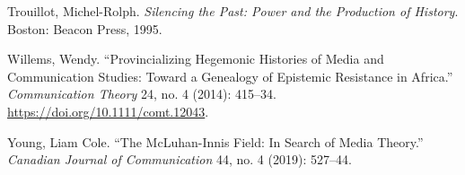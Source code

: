 \documentclass{tufte-handout}
\begin{document}
\begin{hangparas}{.25in}{1}
Trouillot, Michel-Rolph. \emph{Silencing the Past: Power and the
Production of History}. Boston: Beacon Press, 1995.

Willems, Wendy. ``Provincializing Hegemonic Histories of Media and
Communication Studies: Toward a Genealogy of Epistemic Resistance in
Africa.'' \emph{Communication Theory} 24, no. 4 (2014): 415--34.
\url{https://doi.org/10.1111/comt.12043}.

Young, Liam Cole. ``The McLuhan-Innis Field: In Search of Media
Theory.'' \emph{Canadian Journal of Communication} 44, no. 4 (2019):
527­--44.



\end{hangparas}
\end{document}
